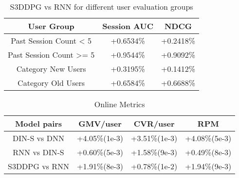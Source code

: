 \begin{table}[htbp]
\centering
\caption{S3DDPG vs RNN for different user evaluation groups}
\begin{tabular}{c|c|c}
\hline
User Group  & Session AUC & NDCG \\
\hline
Past Session Count < 5  & +0.6534\% & +0.2418\% \\
Past Session Count >= 5  & +0.9544\% & +0.9092\%\\
Category New Users & +0.3195\% & +0.1412\% \\
Category Old Users & +0.6584\% & +0.6688\% \\
\hline
\end{tabular}
 \label{tab:user_group_evaluation}
\end{table}

\begin{table}[htbp]
\centering
\caption{Online Metrics}
\begin{tabular}{c|c|c|c}
\hline
Model pairs & GMV/user & CVR/user & RPM \\
\hline
DIN-S vs DNN & +4.05\%(1e-3) & +3.51\%(1e-3) & +4.08\%(5e-3) \\
RNN vs DIN-S & +0.60\%(5e-3) & +1.58\%(9e-3) & +0.49\%(8e-3) \\
S3DDPG vs RNN & +1.91\%(8e-3) & +0.78\%(1e-2) & +1.94\%(9e-3) \\
\hline
\end{tabular}
 \label{tab:online_metrics}
\end{table}
\vspace{-10pt}
